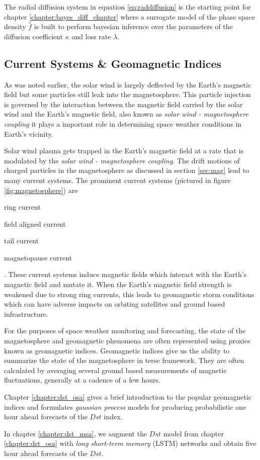 The radial diffusion system in equation \ref{eq:raddiffusion} is the starting point for chapter 
\ref{chapter:bayes_diff_chapter} where a surrogate model of the phase space density $\hat{f}$ is built to 
perform bayesian inference over the parameters of the diffusion coefficient $\kappa$ and loss rate 
$\lambda$.

\subsection{Current Systems \& Geomagnetic Indices}

As was noted earlier, the solar wind is largely deflected by the Earth's magnetic field but some particles still 
leak into the magnetosphere. This particle injection is governed by the interaction between the magnetic field carried 
by the solar wind and the Earth's magnetic field, also known as \emph{solar wind - magnetosphere coupling} it 
plays a important role in determining space weather conditions in Earth's vicinity. 

Solar wind plasma gets trapped in the Earth's magnetic field at a rate that is modulated by the 
\emph{solar wind - magnetosphere coupling}. The drift motions of charged particles in the magnetosphere 
as discussed in section \ref{sec:mag} lead to many current systems. The prominent current systems 
(pictured in figure \ref{fig:magnetosphere}) are \begin{enumerate*} \item ring current 
\item field aligned current \item tail current \item magnetopause current \end{enumerate*}.  
These current systems induce magnetic fields which interact with the Earth's magnetic field and mutate it. 
When the Earth's magnetic field strength is weakened due to strong ring currents, this leads to 
geomagnetic storm conditions which can have adverse impacts on orbiting satellites and ground based 
infrastructure.

For the purposes of space weather monitoring and forecasting, the state of the magnetosphere and geomagnetic 
phenomena are often represented using proxies known as geomagnetic indices. Geomagnetic indices give us the 
ability to summarize the state of the magnetosphere in terse framework. They are often calculated by averaging 
several ground based measurements of magnetic fluctuations, generally at a cadence of a few hours.

Chapter \ref{chapter:dst_osa} gives a brief introduction to the popular geomagnetic indices and formulates 
\emph{gaussian process} models for producing probabilistic one hour ahead forecasts of the $Dst$ 
index. 

In chapter \ref{chapter:dst_msa}, we augment the $Dst$ model from chapter \ref{chapter:dst_osa} with 
\emph{long short-term memory} (LSTM) networks and obtain five hour ahead forecasts of the $Dst$.



\clearpage

%
%
